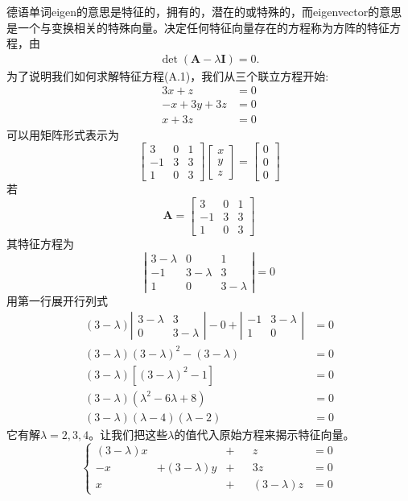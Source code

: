 德语单词eigen的意思是特征的，拥有的，潜在的或特殊的，而eigenvector的意思是一个与变换相关的特殊向量。决定任何特征向量存在的方程称为方阵的特征方程，由
\begin{align}
    \operatorname{det}(\mathbf{A}-\lambda \mathbf{I})=0 .
\end{align}
为了说明我们如何求解特征方程(A.1)，我们从三个联立方程开始:
$$
\begin{aligned}
3 x+z & =0 \\
-x+3 y+3 z & =0 \\
x+3 z & =0
\end{aligned}
$$
可以用矩阵形式表示为
$$
\left[\begin{array}{ccc}
3 & 0 & 1 \\
-1 & 3 & 3 \\
1 & 0 & 3
\end{array}\right]\left[\begin{array}{l}
x \\
y \\
z
\end{array}\right]=\left[\begin{array}{l}
0 \\
0 \\
0
\end{array}\right]
$$
若
$$
\mathbf{A}=\left[\begin{array}{ccc}
3 & 0 & 1 \\
-1 & 3 & 3 \\
1 & 0 & 3
\end{array}\right]
$$
其特征方程为
$$
\left|\begin{array}{ccc}
3-\lambda & 0 & 1 \\
-1 & 3-\lambda & 3 \\
1 & 0 & 3-\lambda
\end{array}\right|=0
$$
用第一行展开行列式
$$
\begin{aligned}
(3-\lambda)\left|\begin{array}{cc}
3-\lambda & 3 \\
0 & 3-\lambda
\end{array}\right|-0+\left|\begin{array}{cc}
-1 & 3-\lambda \\
1 & 0
\end{array}\right| & =0 \\
(3-\lambda)(3-\lambda)^{2}-(3-\lambda) & =0 \\
(3-\lambda)\left[(3-\lambda)^{2}-1\right] & =0 \\
(3-\lambda)\left(\lambda^{2}-6 \lambda+8\right) & =0 \\
(3-\lambda)(\lambda-4)(\lambda-2) & =0
\end{aligned}
$$
它有解$\lambda=2,3,4$。让我们把这些$\lambda$的值代入原始方程来揭示特征向量。
$$
\left\{
\begin{aligned}
    (3-\lambda)x& &+  &&z         &=0\\
    -x & +(3-\lambda)y& +&&3z    &=0\\
    x& &+       &&(3-\lambda)z          &=0
\end{aligned}
\right.
$$

